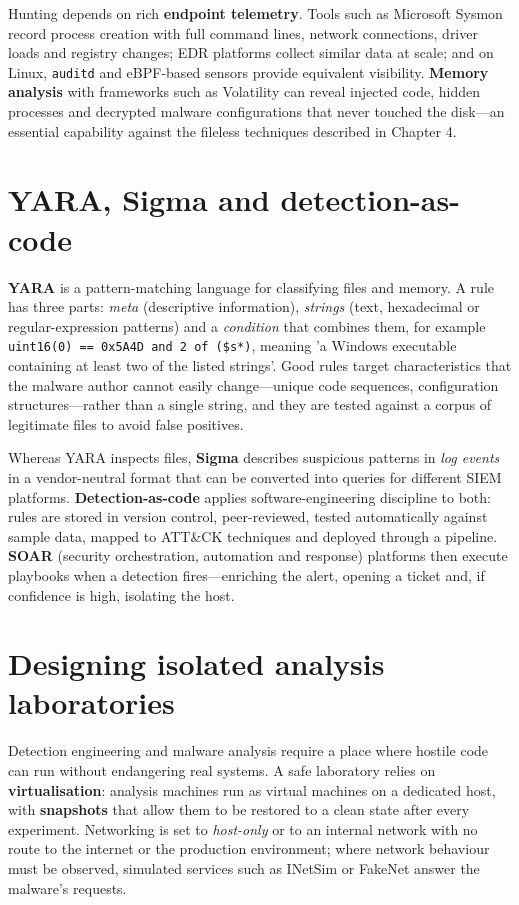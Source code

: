 \documentclass[11pt,openany]{book}
\begin{document}
Hunting depends on rich \textbf{endpoint telemetry}. Tools such as Microsoft Sysmon record process creation with full command lines, network connections, driver loads and registry changes; EDR platforms collect similar data at scale; and on Linux, \texttt{auditd} and eBPF-based sensors provide equivalent visibility. \textbf{Memory analysis} with frameworks such as Volatility can reveal injected code, hidden processes and decrypted malware configurations that never touched the disk—an essential capability against the fileless techniques described in Chapter 4.

\section{YARA, Sigma and detection-as-code}\label{sec:11.4}
\textbf{YARA} is a pattern-matching language for classifying files and memory. A rule has three parts: \emph{meta} (descriptive information), \emph{strings} (text, hexadecimal or regular-expression patterns) and a \emph{condition} that combines them, for example \texttt{uint16(0) == 0x5A4D and 2 of (\$s*)}, meaning 'a Windows executable containing at least two of the listed strings'. Good rules target characteristics that the malware author cannot easily change—unique code sequences, configuration structures—rather than a single string, and they are tested against a corpus of legitimate files to avoid false positives.

Whereas YARA inspects files, \textbf{Sigma} describes suspicious patterns in \emph{log events} in a vendor-neutral format that can be converted into queries for different SIEM platforms. \textbf{Detection-as-code} applies software-engineering discipline to both: rules are stored in version control, peer-reviewed, tested automatically against sample data, mapped to ATT\&CK techniques and deployed through a pipeline. \textbf{SOAR} (security orchestration, automation and response) platforms then execute playbooks when a detection fires—enriching the alert, opening a ticket and, if confidence is high, isolating the host.

\section{Designing isolated analysis laboratories}\label{sec:11.5}
Detection engineering and malware analysis require a place where hostile code can run without endangering real systems. A safe laboratory relies on \textbf{virtualisation}: analysis machines run as virtual machines on a dedicated host, with \textbf{snapshots} that allow them to be restored to a clean state after every experiment. Networking is set to \emph{host-only} or to an internal network with no route to the internet or the production environment; where network behaviour must be observed, simulated services such as INetSim or FakeNet answer the malware's requests.
\end{document}
